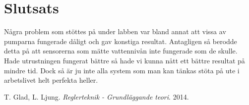 \documentclass[a4paper]{article}
\begin{document}
\section{Slutsats}


Några problem som stöttes på under labben var bland annat att vissa av pumparna fungerade dåligt och gav konstiga resultat.
Antagligen så berodde detta på att sensorerna som mätte vattennivån inte fungerade som de skulle.
Hade utrustningen fungerat bättre så hade vi kunna nått ett bättre resultat på mindre tid.
Dock så är ju inte alla system som man kan tänkas stöta på ute i arbetslivet helt perfekta heller. 

\begin{thebibliography}{9}
    T. Glad, L. Ljung. 
    \emph{Reglerteknik - Grundläggande teori}.
    2014.
\end{thebibliography}
\end{document}
